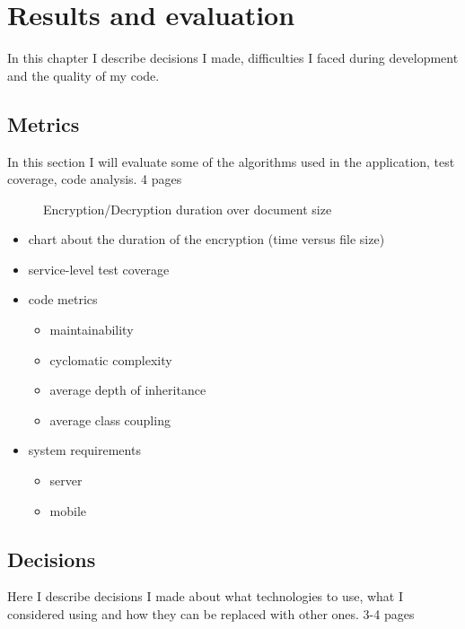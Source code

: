 \chapter{Results and evaluation}\label{ch:elemzes}
\begin{summary}
	In this chapter I describe decisions I made, difficulties I faced during development and the quality of my code.
\end{summary}


\section{Metrics}
In this section I will evaluate some of the algorithms used in the application, test coverage, code analysis. 4 pages

\begin{figure}[H]
	\centering
	
	\caption{Encryption/Decryption duration over document size}
\end{figure}

\begin{itemize}
	\item chart about the duration of the encryption (time versus file size)
	\item service-level test coverage
	\item code metrics
	\begin{itemize}
		\item maintainability
		\item cyclomatic complexity
		\item average depth of inheritance
		\item average class coupling
	\end{itemize}
	\item system requirements
	\begin{itemize}
		\item server
		\item mobile
	\end{itemize}
\end{itemize}

\section{Decisions}
Here I describe decisions I made about what technologies to use, what I considered using and how they can be replaced with other ones. 3-4 pages

